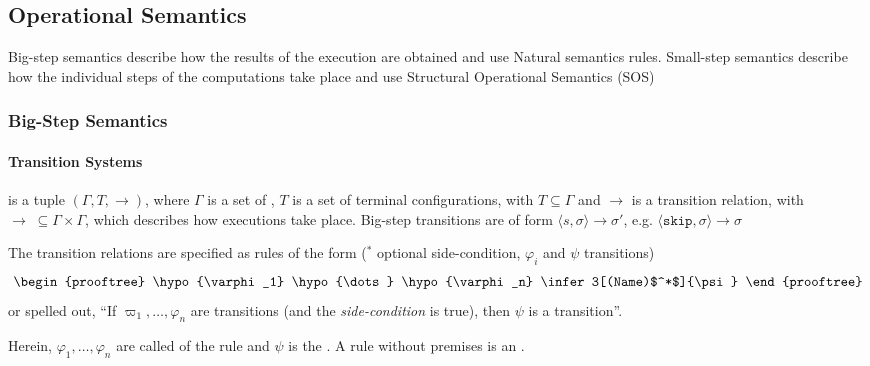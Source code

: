 \newpage
\subsection{Operational Semantics}
Big-step semantics describe how the  results of the execution are obtained and use Natural semantics rules.
Small-step semantics describe how the individual steps of the computations take place and use Structural Operational Semantics (SOS)

\subsubsection{Big-Step Semantics}
\paragraph{Transition Systems}
 is a tuple $(\Gamma, T, \rightarrow)$, where $\Gamma$ is a set of ,
$T$ is a set of terminal configurations, with $T \subseteq \Gamma$ and $\rightarrow$ is a transition relation, with $\rightarrow \; \subseteq \Gamma \times \Gamma$,
which describes how executions take place. Big-step transitions are of form $\langle s, \sigma \rangle \rightarrow \sigma'$,
e.g. $\langle \texttt{skip}, \sigma \rangle \rightarrow \sigma$

The transition relations are specified as rules of the form ($^*$ optional side-condition, $\varphi_i$ and $\psi$ transitions)
\[
    \begin{prooftree}
        \hypo{\varphi_1}
        \hypo{\dots}
        \hypo{\varphi_n}
        \infer3[(Name)$^*$]{\psi}
    \end{prooftree}
\]
or spelled out, ``If $\varpi_1, \ldots, \varphi_n$ are transitions (and the \textit{side-condition} is true), then $\psi$ is a transition''.

Herein, $\varphi_1, \ldots, \varphi_n$ are called  of the rule and $\psi$ is the . A rule without premises is an .
